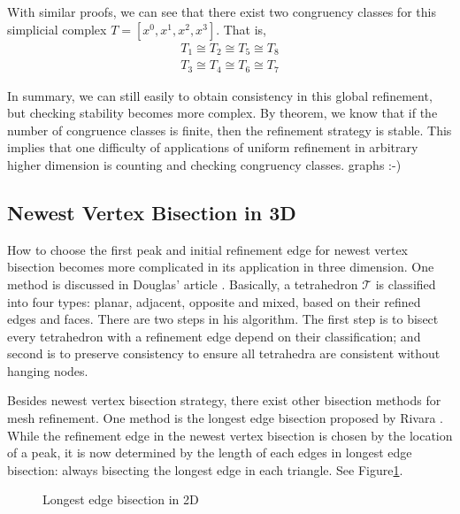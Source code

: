 With similar proofs, we can see that there exist two congruency classes for this simplicial complex $T = [x^0, x^1, x^2, x^3]$. That is,
\begin{align*}
T_1 \cong T_2 \cong T_5 \cong T_8 \\
T_3 \cong T_4 \cong T_6 \cong T_7
\end{align*}

In summary, we can still easily to obtain consistency in this global refinement, but checking stability becomes more complex. By theorem, we know that if the number of congruence classes is finite, then the refinement strategy is stable. This implies that one difficulty of applications of uniform refinement in arbitrary higher dimension is counting and checking congruency classes.
graphs :-)\\

\subsection{Newest Vertex Bisection in 3D}
How to choose the first peak and initial refinement edge for newest vertex bisection becomes more complicated in its application in three dimension. One method is discussed in Douglas' article \cite{arnold2000locally}. 
Basically, a tetrahedron $\mathcal T$ is classified into four types: planar, adjacent, opposite and mixed, based on their refined edges and faces. There are two steps in his algorithm. The first step is to bisect every tetrahedron with a refinement edge depend on their classification; and second is to preserve consistency to ensure all tetrahedra are consistent without hanging nodes.

Besides newest vertex bisection strategy, there exist other bisection methods for mesh refinement. One method is the longest edge bisection proposed by Rivara \cite{rivara1984mesh}. While the refinement edge in the newest vertex bisection is chosen by the location of a peak, it is now determined by the length of each edges in longest edge bisection: always bisecting the longest edge in each triangle. See Figure\ref{Fig14}.

\begin{figure}[h!]
\centering
{}
\caption{Longest edge bisection in 2D}
\label{Fig14}
\end{figure}


